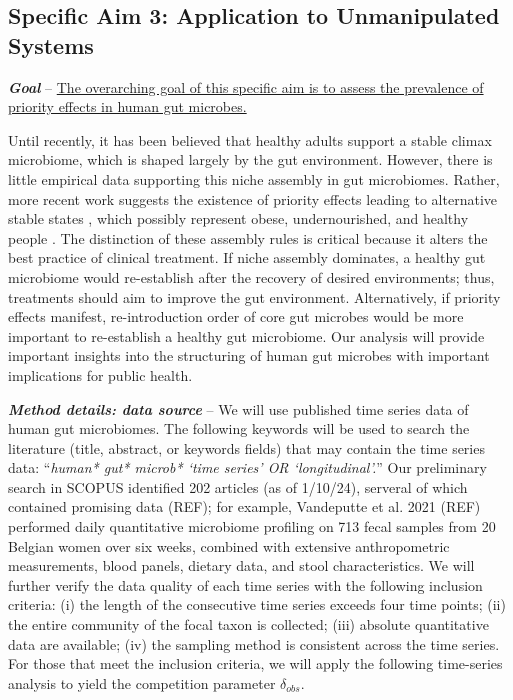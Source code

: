 \documentclass[12pt, class=article, crop=false]{standalone}
\begin{document}
\subsection*{Specific Aim 3: Application to Unmanipulated Systems}

\textbf{\textit{Goal}} -- 
\ul{The overarching goal of this specific aim is to assess the prevalence of priority effects in human gut microbes.}

Until recently, it has been believed that healthy adults support a stable climax microbiome, which is shaped largely by the gut environment.
However, there is little empirical data supporting this niche assembly in gut microbiomes.
Rather, more recent work suggests the existence of priority effects leading to alternative stable states \citep{dominguez-bello_delivery_2010}, which possibly represent obese, undernourished, and healthy people \citep{fierer_animalcules_2012}.
The distinction of these assembly rules is critical because it alters the best practice of clinical treatment.
If niche assembly dominates, a healthy gut microbiome would re-establish after the recovery of desired environments; thus, treatments should aim to improve the gut environment.
Alternatively, if priority effects manifest, re-introduction order of core gut microbes would be more important to re-establish a healthy gut microbiome.
Our analysis will provide important insights into the structuring of human gut microbes with important implications for public health.

\textit{\textbf{Method details: data source}} --
We will use published time series data of human gut microbiomes.
The following keywords will be used to search the literature (title, abstract, or keywords fields) that may contain the time series data: ``\textit{human* gut* microb* `time series' OR `longitudinal'.}''
Our preliminary search in SCOPUS identified 202 articles (as of 1/10/24), serveral of which contained promising data (REF); for example, Vandeputte et al. 2021 (REF) performed daily quantitative microbiome profiling on 713 fecal samples from 20 Belgian women over six weeks, combined with extensive anthropometric measurements, blood panels, dietary data, and stool characteristics. 
We will further verify the data quality of each time series with the following inclusion criteria: (i) the length of the consecutive time series exceeds four time points; (ii) the entire community of the focal taxon is collected; (iii) absolute quantitative data are available; (iv) the sampling method is consistent across the time series.
For those that meet the inclusion criteria, we will apply the following time-series analysis to yield the competition parameter $\delta_{obs}$.
\end{document}
